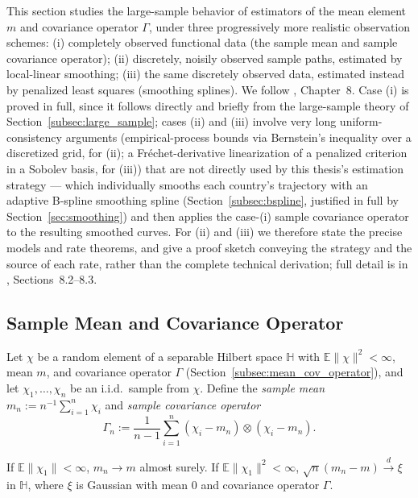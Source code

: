 This section studies the large-sample behavior of estimators of the mean
element $m$ and covariance operator $\Gamma$, under three progressively
more realistic observation schemes: (i) completely observed functional
data (the sample mean and sample covariance operator);
(ii) discretely, noisily observed sample paths, estimated by local-linear
smoothing; (iii) the same discretely observed data, estimated instead by
penalized least squares (smoothing splines). We follow
\cite{hsingeubank2015}, Chapter~8. Case (i) is proved in full, since it
follows directly and briefly from the large-sample theory of
Section~\ref{subsec:large_sample}; cases (ii) and (iii) involve very long
uniform-consistency arguments (empirical-process bounds via Bernstein's
inequality over a discretized grid, for (ii); a Fr\'echet-derivative
linearization of a penalized criterion in a Sobolev basis, for (iii)) that
are not directly used by this thesis's estimation strategy --- which
individually smooths each country's trajectory with an adaptive B-spline
smoothing spline (Section~\ref{subsec:bspline}, justified in full by
Section~\ref{sec:smoothing}) and then applies the case-(i) sample
covariance operator to the resulting smoothed curves. For (ii) and (iii) we
therefore state the precise models and rate theorems, and give a proof
sketch conveying the strategy and the source of each rate, rather than the
complete technical derivation; full detail is in
\cite{hsingeubank2015}, Sections~8.2--8.3.

\subsection{Sample Mean and Covariance Operator}
\label{subsec:sample_mean_cov}

Let $\chi$ be a random element of a separable Hilbert space $\mathbb{H}$
with $\mathbb{E}\|\chi\|^2<\infty$, mean $m$, and covariance operator
$\Gamma$ (Section~\ref{subsec:mean_cov_operator}), and let $\chi_1,\dots,
\chi_n$ be an i.i.d.\ sample from $\chi$. Define the \emph{sample mean}
$m_n:=n^{-1}\sum_{i=1}^n\chi_i$ and \emph{sample covariance operator}
\begin{equation}
\Gamma_n := \frac{1}{n-1}\sum_{i=1}^n(\chi_i-m_n)\otimes(\chi_i-m_n).
\label{eq:sample_covariance}
\end{equation}

\begin{theorem}
\label{thm:sample_mean_asymptotics}
If $\mathbb{E}\|\chi_1\|<\infty$, $m_n\to m$ almost surely. If $\mathbb{E}
\|\chi_1\|^2<\infty$, $\sqrt{n}(m_n-m)\xrightarrow{d}\xi$ in $\mathbb{H}$,
where $\xi$ is Gaussian with mean $0$ and covariance operator $\Gamma$.
\end{theorem}

